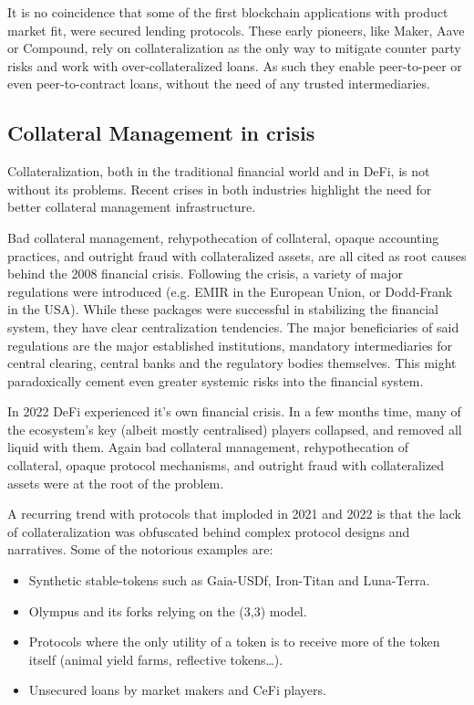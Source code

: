 \documentclass[sigconf,nonacm]{acmart}
\begin{document}
It is no coincidence that some of the first blockchain applications with product market fit, were secured lending protocols.
These early pioneers, like Maker\cite{team2017dai}, Aave\cite{thornburg2020aave} or Compound\cite{leshner2019compound},
rely on collateralization as the only way to mitigate counter party risks and work with over-collateralized loans.
As such they enable peer-to-peer or even peer-to-contract loans, without the need of any trusted intermediaries.

\subsection{Collateral Management in crisis}
Collateralization, both in the traditional financial world and in DeFi, is not without its problems.
Recent crises in both industries highlight the need for better collateral management infrastructure.

Bad collateral management, rehypothecation of collateral, opaque accounting practices,
and outright fraud with collateralized assets, are all cited as root causes\cite{hellwig2008causes} behind the 2008 financial crisis.
Following the crisis, a variety of major regulations were introduced (e.g. EMIR in the European Union, or Dodd-Frank in the USA).
While these packages were successful in stabilizing the financial system, they have clear centralization tendencies\cite{gregory2014central}.
The major beneficiaries of said regulations are the major established institutions, mandatory intermediaries for central clearing,
central banks and the regulatory bodies themselves.
This might paradoxically cement even greater systemic risks into the financial system.

In 2022 DeFi experienced it's own financial crisis.
In a few months time, many of the ecosystem's key (albeit mostly centralised) players collapsed, and removed all liquid with them.
Again bad collateral management, rehypothecation of collateral, opaque protocol mechanisms,
and outright fraud with collateralized assets were at the root of the problem.

A recurring trend with protocols that imploded in 2021 and 2022 is that the lack of collateralization was obfuscated behind complex protocol designs and narratives. 
Some of the notorious examples are:
\begin{itemize}
    \item Synthetic stable-tokens such as Gaia-USDf, Iron-Titan and Luna-Terra.
    \item Olympus and its forks relying on the (3,3) model.
    \item Protocols where the only utility of a token is to receive more of the token itself (animal yield farms, reflective tokens…).
    \item Unsecured loans by market makers and CeFi players.
\end{itemize}
\end{document}
